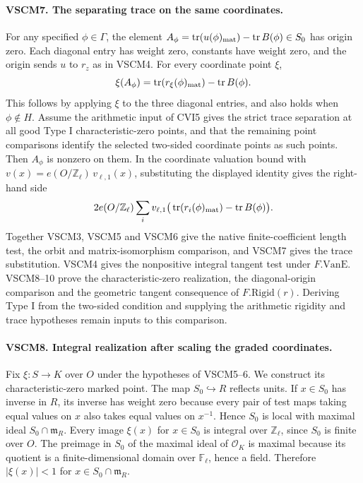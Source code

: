 \paragraph{VSCM7. The separating trace on the same coordinates.}
\label{claim:VSCM7}
For any specified $\phi\in\Gamma$, the element
$A_\phi=\operatorname{tr}(u(\phi)_{\rm mat})-
\operatorname{tr}B(\phi)\in S_0$ has origin zero. Each diagonal
entry has weight zero, constants have weight zero, and the origin sends
$u$ to $r_z$ as in VSCM4. For every coordinate point $\xi$,
\[
    \xi(A_\phi)=\operatorname{tr}(r_\xi(\phi)_{\rm mat})
                    -\operatorname{tr}B(\phi).
\]
This follows by applying $\xi$ to the three diagonal entries,
and also holds when $\phi\notin H$. Assume the arithmetic input
of CVI5 gives the strict trace separation at all good Type I
characteristic-zero points, and that the remaining point comparisons
identify the selected two-sided coordinate points as such points.
Then $A_\phi$ is nonzero on them. In the coordinate valuation bound
with $v(x)=e(O/\mathbb Z_\ell)\,v_{\ell,1}(x)$, substituting the
displayed identity gives the right-hand side
\[
   2e(O/\mathbb Z_\ell)\sum_i v_{\ell,1}
      \big(\operatorname{tr}(r_i(\phi)_{\rm mat})-
                \operatorname{tr}B(\phi)\big).
\]
Together VSCM3, VSCM5 and VSCM6 give the native finite-coefficient
length test, the orbit and matrix-isomorphism comparison, and VSCM7
gives the trace substitution. VSCM4 gives the nonpositive integral
tangent test under $F.\mathrm{VanE}$. VSCM8--10 prove the characteristic-zero realization, the
diagonal-origin comparison and the geometric tangent consequence of
$F.\mathrm{Rigid}(r)$. Deriving Type I from the two-sided condition
and supplying the arithmetic rigidity and trace hypotheses remain
inputs to this comparison.

\paragraph{VSCM8. Integral realization after scaling the graded coordinates.}
\label{claim:VSCM8}
Fix $\xi:S\to K$ over $O$ under the hypotheses of VSCM5--6. We
construct its characteristic-zero marked point.
The map $S_0\hookrightarrow R$ reflects units. If $x\in S_0$ has
inverse in $R$, its inverse has weight zero because every pair of
test maps taking equal values on $x$ also takes equal values on
$x^{-1}$. Hence $S_0$ is local with maximal ideal
$S_0\cap\mathfrak m_R$. Every image $\xi(x)$ for $x\in S_0$
is integral over $\mathbb Z_\ell$, since $S_0$ is finite over $O$.
The preimage in $S_0$ of the maximal ideal of $\mathcal O_K$ is
maximal because its quotient is a finite-dimensional domain over
$\mathbb F_\ell$, hence a field. Therefore
$|\xi(x)|<1$ for $x\in S_0\cap\mathfrak m_R$.


